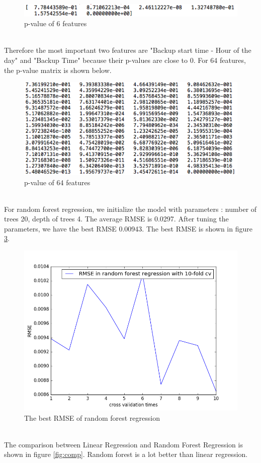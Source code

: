 \documentclass{article}
\begin{document}
\begin{figure}[htbp]
\centering
\includegraphics[width=.8\textwidth]{pvalue-6.png}
\caption{p-value of 6 features}
\label{fig:p6}
\end{figure}
\\
Therefore the most important two features are "Backup start time - Hour of the day" and "Backup Time" because their p-values are close to 0.
For 64 features, the p-value matrix is shown below.\\
\begin{figure}[htbp]
\centering
\includegraphics[width=.8\textwidth]{pvalue-64.png}
\caption{p-value of 64 features}
\label{fig:p64}
\end{figure}
\\
For random forest regression, we initialize the model with parameters : number of trees 20, depth of trees 4. The average RMSE is 0.0297. After tuning the parameters, we have the best RMSE 0.00943. The best RMSE is shown in figure \ref{fig:rf}.\\
\begin{figure}[htbp]
\centering
\includegraphics[width=.6\textwidth]{rf_rmse.png}
\caption{The best RMSE of random forest regression}
\label{fig:rf}
\end{figure}
\\
The comparison between Linear Regression and Random Forest Regression is shown in figure \ref{fig:comp}. Random forest is a lot better than linear regression.\\
\end{document}
